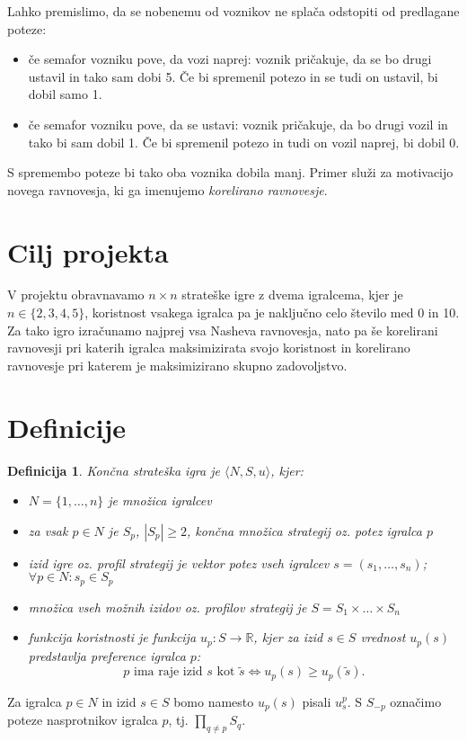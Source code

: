 \documentclass{article}
\newtheorem{definition}{Definicija}
\begin{document}
Lahko premislimo, da se nobenemu od voznikov ne splača odstopiti od predlagane poteze:
\begin{itemize}
    \item če semafor vozniku pove, da vozi naprej: voznik pričakuje, da se bo drugi ustavil in tako sam dobi 5. Če bi spremenil potezo in se tudi on ustavil, bi dobil samo 1.
    \item če semafor vozniku pove, da se ustavi: voznik pričakuje, da bo drugi vozil in tako bi sam dobil 1. Če bi spremenil potezo in tudi on vozil naprej, bi dobil 0.
\end{itemize}
S spremembo poteze bi tako oba voznika dobila manj. Primer služi za motivacijo novega ravnovesja, ki ga imenujemo \emph{korelirano ravnovesje}.

\section{Cilj projekta}
V projektu obravnavamo $n\times n$ strateške igre z dvema igralcema, kjer je $n \in \{2,3,4,5\}$, koristnost vsakega igralca pa je naključno celo število med 0 in 10. Za tako igro izračunamo najprej vsa Nasheva ravnovesja, nato pa še korelirani ravnovesji pri katerih igralca maksimizirata svojo koristnost in korelirano ravnovesje pri katerem je maksimizirano skupno zadovoljstvo. 

\section{Definicije}
\begin{definition}
    \emph{Končna strateška igra} je $\langle N, S, u \rangle$, kjer:
    \begin{itemize}
        \item $N = \{ 1, \dots, n \}$ je \emph{množica igralcev}
        \item za vsak $p \in N$ je $S_p$, $|S_p|\geq 2$, končna množica \emph{strategij} oz. \emph{potez} igralca $p$
        \item \emph{izid igre} oz. \emph{profil strategij} je vektor potez vseh igralcev $s = (s_1, \dots, s_n)$; $\forall p \in N: s_p \in S_p$
        \item \emph{množica vseh možnih izidov} oz. \emph{profilov strategij} je $S = S_1 \times \dots \times S_n$ 
        \item \emph{funkcija koristnosti} je funkcija $u_p: S \to \mathbb{R}$, kjer za izid $s \in S$ vrednost $u_p(s)$ predstavlja preference igralca $p$: 
        $$ \text{$p$ ima raje izid $s$ kot $\tilde{s}$} \iff u_p(s) \geq u_p(\tilde{s}). $$
    \end{itemize}
\end{definition}
Za igralca $p\in N$ in izid $s \in S$ bomo namesto $u_p(s)$ pisali $u_s^p$. S $S_{-p}$ označimo poteze nasprotnikov igralca $p$, tj. $\prod\limits_{q \neq p} S_q$.
\end{document}
